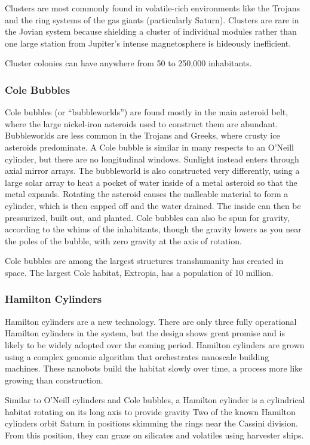 Clusters are most commonly found in volatile-rich environments like the Trojans and the ring systems of the gas giants (particularly Saturn). Clusters are rare in the Jovian system because shielding a cluster of individual modules rather than one large station from Jupiter's intense magnetosphere is hideously inefficient. 

Cluster colonies can have anywhere from 50 to 250,000 inhabitants. 

\subsubsection{Cole Bubbles} 

Cole bubbles (or ``bubbleworlds'') are found mostly in the main asteroid belt, where the large nickel-iron asteroids used to construct them are abundant. Bubbleworlds are less common in the Trojans and Greeks, where crusty ice asteroids predominate. A Cole bubble is similar in many respects to an O'Neill cylinder, but there are no longitudinal windows. Sunlight instead enters through axial mirror arrays. The bubbleworld is also constructed very differently, using a large solar array to heat a pocket of water inside of a metal asteroid so that the metal expands. Rotating the asteroid causes the malleable material to form a cylinder, which is then capped off and the water drained. The inside can then be pressurized, built out, and planted. Cole bubbles can also be spun for gravity, according to the whims of the inhabitants, though the gravity lowers as you near the poles of the bubble, with zero gravity at the axis of rotation. 

Cole bubbles are among the largest structures transhumanity has created in space. The largest Cole habitat, Extropia, has a population of 10 million. 

\subsubsection{Hamilton Cylinders} 

Hamilton cylinders are a new technology. There are only three fully operational Hamilton cylinders in the system, but the design shows great promise and is likely to be widely adopted over the coming period. Hamilton cylinders are grown using a complex genomic algorithm that orchestrates nanoscale building machines. These nanobots build the habitat slowly over time, a process more like growing than construction. 

Similar to O'Neill cylinders and Cole bubbles, a Hamilton cylinder is a cylindrical habitat rotating on its long axis to provide gravity Two of the known Hamilton cylinders orbit Saturn in positions skimming the rings near the Cassini division. From this position, they can graze on silicates and volatiles using harvester ships. 

